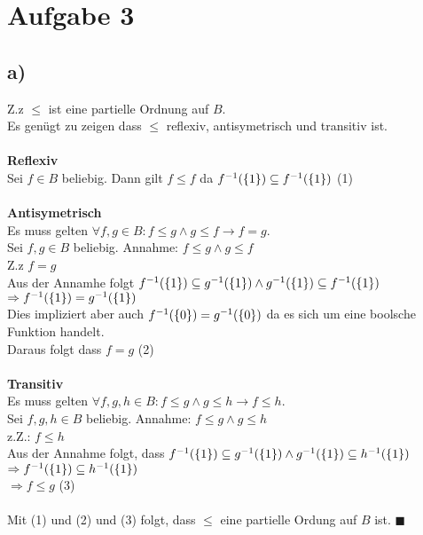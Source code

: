 \section*{Aufgabe 3}
\subsection*{a)}

Z.z $\leq$ ist eine partielle Ordnung auf $B$.\\
Es genügt zu zeigen dass $\leq$ reflexiv, antisymetrisch und transitiv ist.\\\\
\textbf{Reflexiv\\}
Sei $f \in B$ beliebig. Dann gilt $f \leq f$ da $f^{-1}(\{1\}) \subseteq f^{-1}(\{1\})$ (1)\\\\
\textbf{Antisymetrisch \\}
Es muss gelten $\forall f,g \in B : f \leq g \land g \leq f \rightarrow f =g$.\\
Sei $f,g \in B$ beliebig. 
Annahme: $f \leq g \land g \leq f $ \\
Z.z $f =g$\\
Aus der Annamhe folgt $f^{-1}(\{1\}) \subseteq g^{-1}(\{1\}) \land g^{-1}(\{1\}) \subseteq f^{-1}(\{1\}) $\\
 $\Rightarrow f^{-1}(\{1\}) = g^{-1}(\{1\})$\\
Dies impliziert aber auch $f^{-1}(\{0\}) = g^{-1}(\{0\})$ da es sich um eine boolsche Funktion handelt.\\
Daraus folgt dass $f=g$ (2)\\\\
\textbf{Transitiv\\}
Es muss gelten $\forall f,g,h \in B : f \leq g \land g \leq h \rightarrow f \leq h$.\\
Sei $f,g,h \in B$ beliebig. 
Annahme: $f \leq g \land g \leq h$\\
z.Z.: $f \leq h$\\
Aus der Annahme folgt, dass  $f^{-1}(\{1\}) \subseteq g^{-1}(\{1\}) \land g^{-1}(\{1\}) \subseteq h^{-1}(\{1\})$\\
$\Rightarrow f^{-1}(\{1\}) \subseteq h^{-1}(\{1\})$\\
$\Rightarrow f \leq g$ (3)\\\\
Mit (1) und (2) und (3) folgt, dass $\leq$ eine partielle Ordung auf $B$ ist. $\blacksquare$

